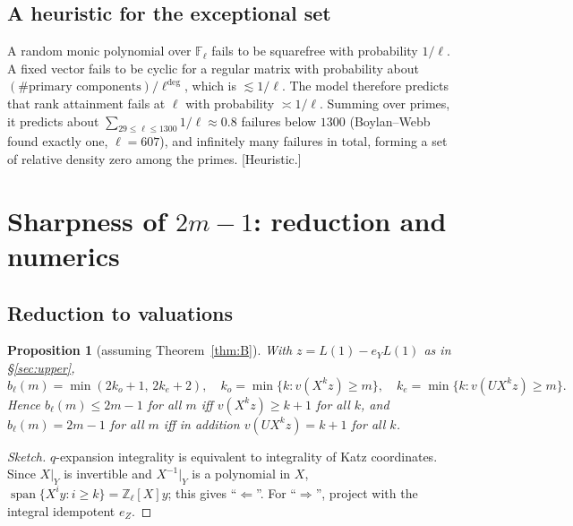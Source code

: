 \documentclass[11pt]{amsart}
\newcommand{\Zl}{\mathbb{Z}_\ell}
\newcommand{\Fl}{\mathbb{F}_\ell}
\DeclareMathOperator{\Span}{span}
\newcommand{\st}[1]{\textup{\textsf{[#1]}}}
\theoremstyle{plain}
\newtheorem{proposition}[theorem]{Proposition}
\theoremstyle{definition}
\numberwithin{equation}{section}
\begin{document}
\subsection{A heuristic for the exceptional set}
A random monic polynomial over $\Fl$ fails to be squarefree with probability $1/\ell$. A fixed vector fails to be cyclic for
a regular matrix with probability about $(\#\text{primary components})/\ell^{\deg}$, which is $\lesssim1/\ell$. The model
therefore predicts that rank attainment fails at $\ell$ with probability $\asymp1/\ell$. Summing over primes, it predicts
about $\sum_{29\le\ell\le1300}1/\ell\approx0.8$ failures below $1300$ (Boylan--Webb found exactly one, $\ell=607$), and
infinitely many failures in total, forming a set of relative density zero among the primes. \st{Heuristic.}

\section{Sharpness of $2m-1$: reduction and numerics}\label{sec:numerics}

\subsection{Reduction to valuations}
\begin{proposition}[assuming Theorem~\ref{thm:B}]\label{prop:reduction}
With $z=L(1)-e_YL(1)$ as in \S\ref{sec:upper},
\[
  b_\ell(m)=\min(2k_o+1,\,2k_e+2),\quad k_o=\min\{k:v(X^kz)\ge m\},\quad k_e=\min\{k:v(UX^kz)\ge m\}.
\]
Hence $b_\ell(m)\le2m-1$ for all $m$ iff $v(X^kz)\ge k+1$ for all $k$, and $b_\ell(m)=2m-1$ for all $m$ iff in addition
$v(UX^kz)=k+1$ for all $k$.
\end{proposition}
\begin{proof}[Sketch]
$q$-expansion integrality is equivalent to integrality of Katz coordinates. Since $X|_Y$ is invertible and $X^{-1}|_Y$ is a
polynomial in $X$, $\Span\{X^iy:i\ge k\}=\Zl[X]y$; this gives ``$\Leftarrow$''. For ``$\Rightarrow$'', project with the
integral idempotent $e_Z$.
\end{proof}
\end{document}
